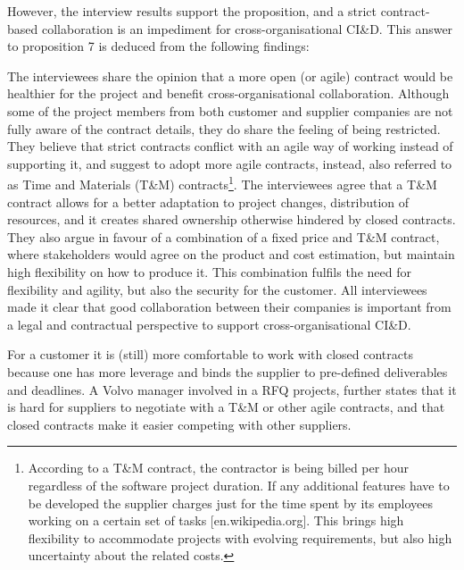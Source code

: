 However, the interview results support the proposition, and a strict contract-based collaboration is an impediment for cross-organisational CI\&D. This answer to proposition 7 is deduced from the following findings:


 The interviewees share the opinion that a more open (or agile) contract would be healthier for the project and benefit cross-organisational collaboration. Although some of the project members from both customer and supplier companies are not fully aware of the contract details, they do share the feeling of being restricted. They believe that strict contracts conflict with an agile way of working instead of supporting it, and suggest to adopt more agile contracts, instead, also referred to as Time and Materials (T\&M) contracts\footnote{According to a T\&M contract, the contractor is being billed per hour regardless of the software project duration. If any additional features have to be developed the supplier charges just for the time spent by its employees working on a certain set of tasks [en.wikipedia.org]. This brings high flexibility to accommodate projects with evolving requirements, but also high uncertainty about the related costs.}. 
The interviewees agree that a T\&M contract allows for a better adaptation to project changes, distribution of resources, and it creates shared ownership otherwise hindered by closed contracts. They also argue in favour of a combination of a fixed price and T\&M contract, where stakeholders would agree on the product and cost estimation, but maintain high flexibility on how to produce it. This combination fulfils the need for flexibility and agility, but also the security for the customer. All interviewees made it clear that good collaboration between their companies is important from a legal and contractual perspective to support cross-organisational CI\&D.

 For a customer it is (still) more comfortable to work with closed contracts because one has more leverage and binds the supplier to pre-defined deliverables and deadlines. A Volvo manager involved in a RFQ projects, further states that it is hard for suppliers to negotiate with a T\&M or other agile contracts, and that closed contracts make it easier competing with other suppliers.

